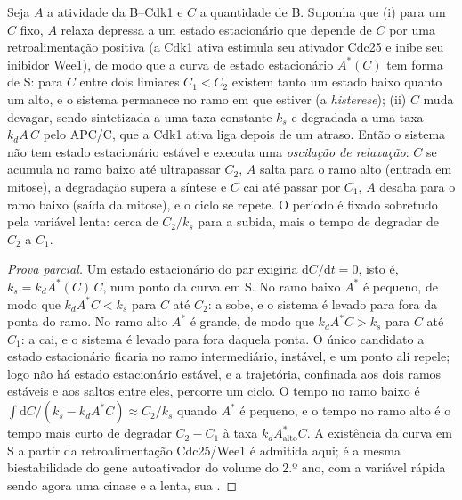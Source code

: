 \begin{theorem}\label{thm:b3:cell-cycle-apoptosis:oscillator}
Seja $A$ a atividade da  B--Cdk1 e $C$ a quantidade de 
B. Suponha que (i) para um $C$ fixo, $A$ relaxa depressa a um estado
estacionário que depende de $C$ por uma retroalimentação positiva (a
Cdk1 ativa estimula seu ativador Cdc25 e inibe seu inibidor Wee1), de modo
que a curva de estado estacionário $A^{*}(C)$ tem forma de S: para $C$
entre dois limiares $C_{1} < C_{2}$ existem tanto um estado baixo
quanto um alto, e o sistema permanece no ramo em que estiver (a
\emph{histerese}); (ii) $C$ muda devagar, sendo sintetizada a uma taxa
constante $k_{s}$ e degradada a uma taxa $k_{d}A\,C$ pelo APC/C, que a
Cdk1 ativa liga depois de um atraso. Então o sistema não tem estado
estacionário estável e executa uma \emph{oscilação de relaxação}: $C$
se acumula no ramo baixo até ultrapassar $C_{2}$, $A$ salta para o ramo
alto (entrada em mitose), a degradação supera a síntese e $C$ cai até
passar por $C_{1}$, $A$ desaba para o ramo baixo (saída da mitose), e o
ciclo se repete. O período é fixado sobretudo pela variável lenta:
cerca de $C_{2}/k_{s}$ para a subida, mais o tempo de degradar de
$C_{2}$ a $C_{1}$.
\end{theorem}
\begin{proof}[Prova parcial]
Um estado estacionário do par exigiria $\mathrm{d}C/\mathrm{d}t = 0$,
isto é, $k_{s} = k_{d}A^{*}(C)\,C$, num ponto da curva em S. No ramo
baixo $A^{*}$ é pequeno, de modo que $k_{d}A^{*}C < k_{s}$ para $C$ até
$C_{2}$: a  sobe, e o sistema é levado para fora da ponta do
ramo. No ramo alto $A^{*}$ é grande, de modo que $k_{d}A^{*}C > k_{s}$
para $C$ até $C_{1}$: a  cai, e o sistema é levado para fora
daquela ponta. O único candidato a estado estacionário ficaria no ramo
intermediário, instável, e um ponto ali repele; logo não há estado
estacionário estável, e a trajetória, confinada aos dois ramos estáveis
e aos saltos entre eles, percorre um ciclo. O tempo no ramo baixo é
$\int \mathrm{d}C/(k_{s} - k_{d}A^{*}C) \approx C_{2}/k_{s}$ quando
$A^{*}$ é pequeno, e o tempo no ramo alto é o tempo mais curto de
degradar $C_{2} - C_{1}$ à taxa $k_{d}A^{*}_{\text{alto}}C$. A
existência da curva em S a partir da retroalimentação Cdc25/Wee1 é
admitida aqui; é a mesma biestabilidade do gene autoativador do volume
do 2.º ano, com a variável rápida sendo agora uma cinase e a lenta, sua
.
\end{proof}

